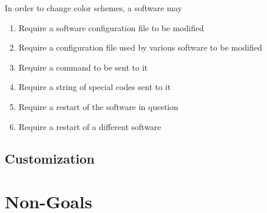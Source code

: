 \documentclass{article}
\theoremstyle{definition}
\begin{document}
    In order to change color schemes, a software may

    \begin{enumerate}
        \item Require a software configuration file to be modified
        \item Require a configuration file used by various software to be modified
        \item Require a command to be sent to it
        \item Require a string of special codes sent to it
        \item Require a restart of the software in question
        \item Require a restart of a different software
    \end{enumerate}

    \subsection{Customization}


    \newpage


    \section{Non-Goals}
\end{document}
